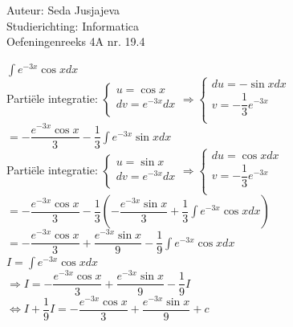 \documentclass[a4paper]{article}
\newcommand{\integral}{\displaystyle\int}
\begin{document}
\noindent \large Auteur: Seda Jusjajeva\\
\noindent \large Studierichting: Informatica\\
\noindent \large Oefeningenreeks 4A nr. 19.4 \\

\medskip

\normalsize


$\integral e^{-3x}\cos xdx$ \\

Partiële integratie: $\left\{\begin{array}{l}
    u = \cos x \\
    dv = e^{-3x}dx \\
\end{array}\right.\Rightarrow\left\{\begin{array}{l}
    du = -\sin xdx \\
    v = -\dfrac{1}{3}e^{-3x} \\
\end{array}\right.$ \\

$= -\dfrac{e^{-3x} \cos x}{3} - \dfrac{1}{3}\integral e^{-3x}\sin xdx$ \\

Partiële integratie: $\left\{\begin{array}{l}
    u =  \sin x \\
    dv = e^{-3x}dx \\
\end{array}\right. \Rightarrow\left\{\begin{array}{l}
    du = \cos xdx \\
    v = -\dfrac{1}{3}e^{-3x} \\
\end{array}\right.$ \\

$= -\dfrac{e^{-3x} \cos x}{3} - \dfrac{1}{3}\left(-\dfrac{e^{-3x} \sin x}{3} + \dfrac{1}{3}\integral e^{-3x}\cos xdx\right)$ \\

$= -\dfrac{e^{-3x} \cos x}{3} + \dfrac{e^{-3x} \sin x}{9} - \dfrac{1}{9}\integral e^{-3x}\cos xdx$ \\

$I = \integral e^{-3x}\cos xdx$ \\

$\Rightarrow I = -\dfrac{e^{-3x} \cos x}{3} + \dfrac{e^{-3x} \sin x}{9} - \dfrac{1}{9}I$ \\

$\Leftrightarrow I + \dfrac{1}{9}I = -\dfrac{e^{-3x} \cos x}{3} + \dfrac{e^{-3x} \sin x}{9} + c$ \\
\end{document}
